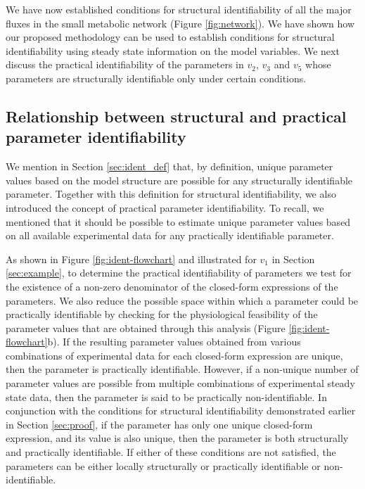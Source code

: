 \documentclass[10pt]{article}
\begin{document}
	We have now established conditions for structural identifiability of all the major fluxes in the small metabolic network (Figure \ref{fig:network}). We have shown how our proposed methodology can be used to establish conditions for structural identifiability using steady state information on the model variables. We next discuss the practical identifiability of the parameters in $v_2$, $v_3$ and $v_5$ whose parameters are structurally identifiable only under certain conditions. 
	
	\subsection{Relationship between structural and practical parameter identifiability}\label{sec:initial_analysis}
	We mention in Section \ref{sec:ident_def} that, by definition, unique parameter values based on the model structure are possible for any structurally identifiable parameter. Together with this definition for structural identifiability, we also introduced the concept of practical parameter identifiability. To recall, we mentioned that  it should be possible to estimate unique parameter values based on all available experimental data for any practically identifiable parameter. 
	
	As shown in Figure \ref{fig:ident-flowchart} and illustrated for $v_1$ in Section \ref{sec:example}, to determine the practical identifiability of parameters we test for the existence of a non-zero denominator of the closed-form expressions of the parameters. We also reduce the possible space within which a parameter could be practically identifiable by checking for the physiological feasibility of the parameter values that are obtained through this analysis (Figure \ref{fig:ident-flowchart}b). If the resulting parameter values obtained from various combinations of experimental data for each closed-form expression are unique, then the parameter is practically identifiable. However, if a non-unique number of parameter values are possible from multiple combinations of experimental steady state data, then the parameter is said to be practically non-identifiable. In conjunction with the conditions for structural identifiability demonstrated earlier in Section \ref{sec:proof}, if the parameter has only one unique closed-form expression, and its value is also unique, then the parameter is both structurally and practically identifiable. If either of these conditions are not satisfied, the parameters can be either locally structurally or practically identifiable or non-identifiable.
	
\end{document}
